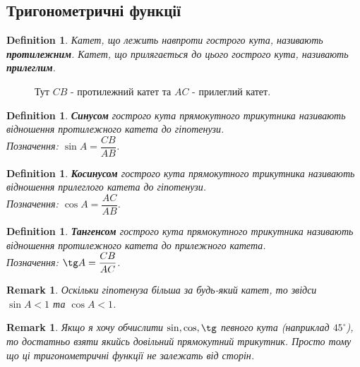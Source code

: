 \documentclass[a4paper, 10pt]{article}
\theoremstyle{theoremdd}
\theoremstyle{theoremdd}
\theoremstyle{theoremdd}
\newtheorem{definition}[theorem]{Definition}
\theoremstyle{theoremdd}
\theoremstyle{theoremdd}
\theoremstyle{theoremdd}
\theoremstyle{theoremdd}
\newtheorem{remark}[theorem]{Remark}
\theoremstyle{theoremdd}
\theoremstyle{theoremdd}
\begin{document}
\subsection{Тригонометричні функції}
\begin{definition}
Катет, що лежить навпроти гострого кута, називають \textbf{протилежним}. Катет, що прилягається до цього гострого кута, називають \textbf{прилеглим}. 
\end{definition}

\begin{figure}[H]
\centering
{}
\caption*{Тут $CB$ - протилежний катет та $AC$ - прилеглий катет.}
\end{figure}

\begin{definition}
\textbf{Синусом} гострого кута прямокутного трикутника називають відношення протилежного катета до гіпотенузи.\\
Позначення: $\sin A = \dfrac{CB}{AB}$.
\end{definition}

\begin{definition}
\textbf{Косинусом} гострого кута прямокутного трикутника називають відношення прилеглого катета до гіпотенузи.\\
Позначення: $\cos A = \dfrac{AC}{AB}$.
\end{definition}

\begin{definition}
\textbf{Тангенсом} гострого кута прямокутного трикутника називають відношення протилежного катета до прилежного катета.\\
Позначення: $\tg A = \dfrac{CB}{AC}$.
\end{definition}

\begin{remark}
Оскільки гіпотенуза більша за будь-який катет, то звідси $\sin A < 1$ та $\cos A < 1$.
\end{remark}

\begin{remark}
Якщо я хочу обчислити $\sin, \cos, \tg$ певного кута (наприклад $45^\circ$), то достатньо взяти якийсь довільний прямокутний трикутник. Просто тому що ці тригонометричні функції не залежать від сторін.
\end{remark}
\end{document}
